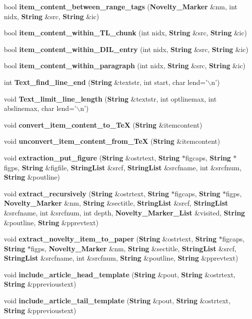 \begin{CompactItemize}
\item 
bool {\bf item\_\-content\_\-between\_\-range\_\-tags} ({\bf Novelty\_\-Marker} \&nm, int nidx, {\bf String} \&src, {\bf String} \&ic)
\item 
bool {\bf item\_\-content\_\-within\_\-TL\_\-chunk} (int nidx, {\bf String} \&src, {\bf String} \&ic)
\item 
bool {\bf item\_\-content\_\-within\_\-DIL\_\-entry} (int nidx, {\bf String} \&src, {\bf String} \&ic)
\item 
bool {\bf item\_\-content\_\-within\_\-paragraph} (int nidx, {\bf String} \&src, {\bf String} \&ic)
\item 
int {\bf Text\_\-find\_\-line\_\-end} ({\bf String} \&textstr, int start, char lend='$\backslash$n')
\item 
void {\bf Text\_\-limit\_\-line\_\-length} ({\bf String} \&textstr, int optlinemax, int abslinemax, char lend='$\backslash$n')
\item 
void {\bf convert\_\-item\_\-content\_\-to\_\-Te\-X} ({\bf String} \&itemcontent)
\item 
void {\bf unconvert\_\-item\_\-content\_\-from\_\-Te\-X} ({\bf String} \&itemcontent)
\item 
void {\bf extraction\_\-put\_\-figure} ({\bf String} \&ostrtext, {\bf String} $\ast$figcaps, {\bf String} $\ast$figps, {\bf String} \&figfile, {\bf String\-List} \&srcf, {\bf String\-List} \&srcfname, int \&srcfnum, {\bf String} \&poutline)
\item 
void {\bf extract\_\-recursively} ({\bf String} \&ostrtext, {\bf String} $\ast$figcaps, {\bf String} $\ast$figps, {\bf Novelty\_\-Marker} \&nm, {\bf String} \&sectitle, {\bf String\-List} \&srcf, {\bf String\-List} \&srcfname, int \&srcfnum, int depth, {\bf Novelty\_\-Marker\_\-List} \&visited, {\bf String} \&poutline, {\bf String} \&pprevtext)
\item 
void {\bf extract\_\-novelty\_\-item\_\-to\_\-paper} ({\bf String} \&ostrtext, {\bf String} $\ast$figcaps, {\bf String} $\ast$figps, {\bf Novelty\_\-Marker} \&nm, {\bf String} \&sectitle, {\bf String\-List} \&srcf, {\bf String\-List} \&srcfname, int \&srcfnum, {\bf String} \&poutline, {\bf String} \&pprevtext)
\item 
void {\bf include\_\-article\_\-head\_\-template} ({\bf String} \&pout, {\bf String} \&ostrtext, {\bf String} \&pprevioustext)
\item 
void {\bf include\_\-article\_\-tail\_\-template} ({\bf String} \&pout, {\bf String} \&ostrtext, {\bf String} \&pprevioustext)

\end{CompactItemize}
